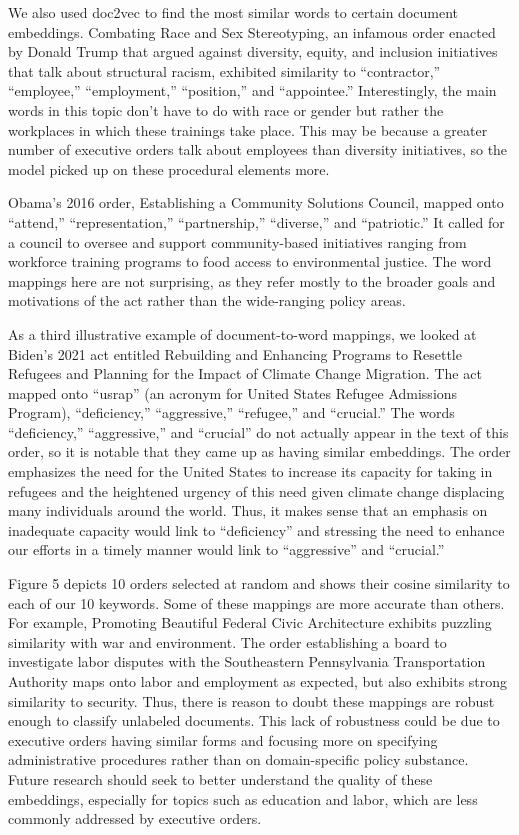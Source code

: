 \documentclass{article}
\begin{document}
{{We also used doc2vec to find the most similar words to certain document embeddings. Combating Race and Sex Stereotyping, an infamous order enacted by Donald Trump that argued against diversity, equity, and inclusion initiatives that talk about structural racism, exhibited similarity to “contractor,” “employee,” “employment,” “position,” and “appointee.” Interestingly, the main words in this topic don’t have to do with race or gender but rather the workplaces in which these trainings take place. This may be because a greater number of executive orders talk about employees than diversity initiatives, so the model picked up on these procedural elements more. 
	
Obama’s 2016 order, Establishing a Community Solutions Council, mapped onto “attend,” “representation,” “partnership,” “diverse,” and “patriotic.” It called for a council to oversee and support community-based initiatives ranging from workforce training programs to food access to environmental justice. The word mappings here are not surprising, as they refer mostly to the broader goals and motivations of the act rather than the wide-ranging policy areas. 
	
As a third illustrative example of document-to-word mappings, we looked at Biden’s 2021 act entitled Rebuilding and Enhancing Programs to Resettle Refugees and Planning for the Impact of Climate Change Migration. The act mapped onto “usrap” (an acronym for United States Refugee Admissions Program), “deficiency,” “aggressive,” “refugee,” and “crucial.” The words “deficiency,” “aggressive,” and “crucial” do not actually appear in the text of this order, so it is notable that they came up as having similar embeddings. The order emphasizes the need for the United States to increase its capacity for taking in refugees and the heightened urgency of this need given climate change displacing many individuals around the world. Thus, it makes sense that an emphasis on inadequate capacity would link to “deficiency” and stressing the need to enhance our efforts in a timely manner would link to “aggressive” and “crucial.” 
	
Figure 5 depicts 10 orders selected at random and shows their cosine similarity to each of our 10 keywords. Some of these mappings are more accurate than others. For example, Promoting Beautiful Federal Civic Architecture exhibits puzzling similarity with war and environment. The order establishing a board to investigate labor disputes with the Southeastern Pennsylvania Transportation Authority maps onto labor and employment as expected, but also exhibits strong similarity to security. Thus, there is reason to doubt these mappings are robust enough to classify unlabeled documents. This lack of robustness could be due to executive orders having similar forms and focusing more on specifying administrative procedures rather than on domain-specific policy substance. Future research should seek to better understand the quality of these embeddings, especially for topics such as education and labor, which are less commonly addressed by executive orders.

}}
\end{document}

